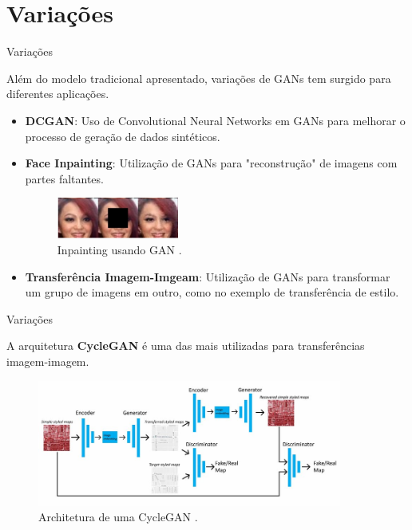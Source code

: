 \documentclass[10pt]{beamer}
\begin{document}
\AtBeginSection{}
\section[Variações]{Variações}
\begin{frame}[fragile]{Variações}

	Além do modelo tradicional apresentado, variações de GANs
	tem surgido para diferentes aplicações.

	\begin{itemize}
		\item \textbf{DCGAN}: Uso de Convolutional Neural Networks
		em GANs para melhorar o processo de geração de dados sintéticos.
		\item \textbf{Face Inpainting}: Utilização de GANs para
		"reconstrução" de imagens com partes faltantes.

    \begin{figure}[H]
        \centering
        \includegraphics[width=4cm]{images/gan-inpainting.png}
        \caption{Inpainting usando GAN \citep{yeh2017}.}
    \end{figure}

		\item \textbf{Transferência Imagem-Imgeam}:
		Utilização de GANs para transformar um grupo de imagens
		em outro, como no exemplo de transferência de estilo.


	\end{itemize}

\end{frame}

\begin{frame}[fragile]{Variações}

	A arquitetura \textbf{CycleGAN} \citep{zhu2017} é uma das
	mais utilizadas para transferências imagem-imagem.
    \begin{figure}[H]
        \centering
        \includegraphics[width=10cm]{images/gan-cyclearch.jpg}
        \caption{Architetura de uma CycleGAN \citep{kang2019}.}
    \end{figure}

\end{frame}
\end{document}
